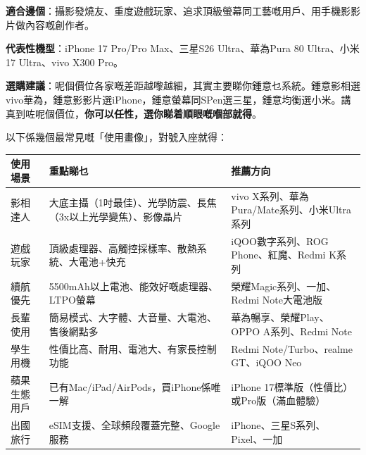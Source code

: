 
\textbf{適合邊個}：攝影發燒友、重度遊戲玩家、追求頂級螢幕同工藝嘅用戶、用手機影影片做內容嘅創作者。

\textbf{代表性機型}：iPhone 17 Pro/Pro Max、三星S26 Ultra、華為Pura 80 Ultra、小米17 Ultra、vivo X300 Pro。

\textbf{選購建議}：呢個價位各家嘅差距越嚟越細，其實主要睇你鍾意乜系統。鍾意影相選vivo華為，鍾意影影片選iPhone，鍾意螢幕同SPen選三星，鍾意均衡選小米。講真到咗呢個價位，\textbf{你可以任性，選你睇着順眼嘅嗰部就得}。


以下係幾個最常見嘅「使用畫像」，對號入座就得：

\begin{center}
\begin{tabularx}{\linewidth}{|X|X|X|}
\hline
\textbf{使用場景} & \textbf{重點睇乜} & \textbf{推薦方向} \tabularnewline
\hline
影相達人 & 大底主攝（1吋最佳）、光學防震、長焦（3x以上光學變焦）、影像晶片 & vivo X系列、華為Pura/Mate系列、小米Ultra系列 \tabularnewline
遊戲玩家 & 頂級處理器、高觸控採樣率、散熱系統、大電池+快充 & iQOO數字系列、ROG Phone、紅魔、Redmi K系列 \tabularnewline
續航優先 & 5500mAh以上電池、能效好嘅處理器、LTPO螢幕 & 榮耀Magic系列、一加、Redmi Note大電池版 \tabularnewline
長輩使用 & 簡易模式、大字體、大音量、大電池、售後網點多 & 華為暢享、榮耀Play、OPPO A系列、Redmi Note \tabularnewline
學生用機 & 性價比高、耐用、電池大、有家長控制功能 & Redmi Note/Turbo、realme GT、iQOO Neo \tabularnewline
蘋果生態用戶 & 已有Mac/iPad/AirPods，買iPhone係唯一解 & iPhone 17標準版（性價比）或Pro版（滿血體驗） \tabularnewline
出國旅行 & eSIM支援、全球頻段覆蓋完整、Google服務 & iPhone、三星S系列、Pixel、一加 \tabularnewline
\hline
\end{tabularx}
\end{center}


